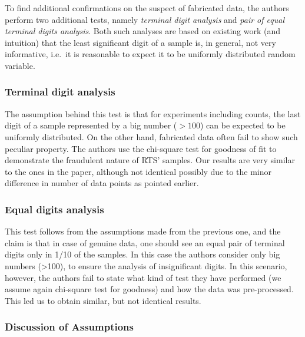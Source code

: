 \documentclass{article}
\begin{document}
To find additional confirmations on the suspect of fabricated data, the
authors perform two additional tests, namely \textit{terminal
digit analysis} and \textit{pair of equal terminal digits analysis}. Both
such analyses are based on existing work (and intuition) that the least significant digit of a sample is, in general, not very informative, i.e.~it is reasonable to expect it to be uniformly distributed random variable.



\subsubsection{Terminal digit analysis}\label{terminal-digit-analysis}

The assumption behind this test is that for experiments including
counts, the last digit of a sample represented by a big number
($>100$) can be expected to be uniformly distributed. On the
other hand, fabricated data often fail to show such peculiar property.
The authors use the chi-square test for goodness of fit to demonstrate
the fraudulent nature of RTS' samples. Our results are very similar to
the ones in the paper, although not identical possibly due to the minor difference in number of data points as pointed earlier.

\subsubsection{Equal digits analysis}\label{equal-digits-analysis}

This test follows from the assumptions made from the previous one, and the claim is that in case of genuine data, one should see an equal
pair of terminal digits only in 1/10 of the samples. In this case the
authors consider only big numbers (\textgreater{}100), to ensure the
analysis of insignificant digits. In this scenario, however,
the authors fail to state what kind of test they have performed (we
assume again chi-square test for goodness) and how the data was
pre-processed. This led us to obtain similar, but not identical results.



\subsubsection{Discussion of
Assumptions}\label{discussion-of-assumptions}
\end{document}
